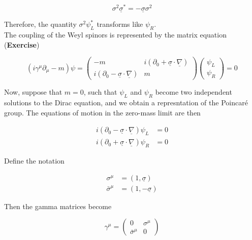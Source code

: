 \begin{equation}
\sigma^2 \underline{\sigma}^* = - \underline{\sigma} \sigma^2
\end{equation}

\noindent Therefore, the quantity $\sigma^2 \psi_L^*$ transforms like $\psi_R$. \\

\noindent The coupling of the Weyl spinors is represented by the matrix equation (\textbf{Exercise})

\begin{equation}
\left( i \gamma^\mu \partial_\mu - m \right) \psi = \left( \begin{array}{cc} -m & i(\partial_0 + \underline{\sigma} \cdot \underline{\nabla}) \\ i(\partial_0 - \underline{\sigma} \cdot \underline{\nabla}) & m \end{array} \right) \left( \begin{array}{c} \psi_L \\ \psi_R \end{array} \right) = 0
\end{equation}

\noindent Now, suppose that $m=0$, such that $\psi_L$ and $\psi_R$ become two independent solutions to the Dirac equation, and we obtain a represntation of the Poincar\'e group. The equations of motion in the zero-mass limit are then

\begin{align}
i (\partial_0 - \underline{\sigma} \cdot \underline{\nabla} ) \psi_L &= 0 \\
i (\partial_0 + \underline{\sigma} \cdot \underline{\nabla} ) \psi_R &= 0 
\end{align}

\noindent Define the notation

\begin{align}
\sigma^\mu &= (1, \underline{\sigma}) \\
\bar{\sigma}^\mu &= (1, -\underline{\sigma})
\end{align}

\noindent Then the gamma matrices become

\begin{equation}
\gamma^\mu = \left( \begin{array}{cc} 0 & \sigma^\mu \\ \bar{\sigma}^\mu & 0 \end{array} \right)
\end{equation}

